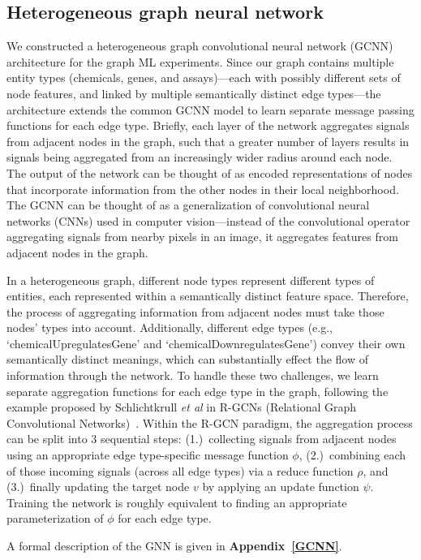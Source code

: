 \documentclass{ws-procs11x85}
\begin{document}
\subsection{Heterogeneous graph neural network}
We constructed a heterogeneous graph convolutional neural network (GCNN) architecture for the graph ML experiments.
Since our graph contains multiple entity types (chemicals, genes, and assays)---each with possibly different sets of node features, and linked by multiple semantically distinct edge types---the architecture extends the common GCNN model to learn separate message passing functions for each edge type.
Briefly, each layer of the network aggregates signals from adjacent nodes in the graph, such that a greater number of layers results in signals being aggregated from an increasingly wider radius around each node.
The output of the network can be thought of as encoded representations of nodes that incorporate information from the other nodes in their local neighborhood.
The GCNN can be thought of as a generalization of convolutional neural networks (CNNs) used in computer vision---instead of the convolutional operator aggregating signals from nearby pixels in an image, it aggregates features from adjacent nodes in the graph.

In a heterogeneous graph, different node types represent different types of entities, each represented within a semantically distinct feature space.
Therefore, the process of aggregating information from adjacent nodes must take those nodes' types into account.
Additionally, different edge types (e.g., `chemicalUpregulatesGene' and `chemicalDownregulatesGene') convey their own semantically distinct meanings, which can substantially effect the flow of information through the network.
To handle these two challenges, we learn separate aggregation functions for each edge type in the graph, following the example proposed by Schlichtkrull \textit{et al} in R-GCNs (Relational Graph Convolutional Networks)~\cite{schlichtkrull2018modeling}.
Within the R-GCN paradigm, the aggregation process can be split into 3 sequential steps: (1.)~collecting signals from adjacent nodes using an appropriate edge type-specific message function $\phi$, (2.)~combining each of those incoming signals (across all edge types) via a reduce function $\rho$, and (3.)~finally updating the target node $v$ by applying an update function $\psi$.
Training the network is roughly equivalent to finding an appropriate parameterization of $\phi$ for each edge type.

A formal description of the GNN is given in \textbf{Appendix~\ref{GCNN}}.
\end{document}
